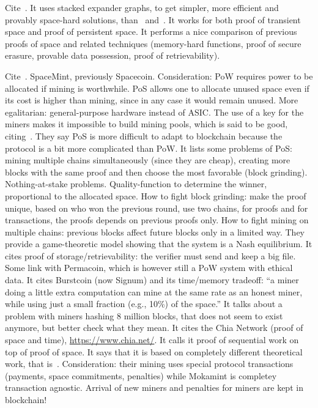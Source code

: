 Cite~\cite{RenD16}. It uses stacked expander graphs, to get simpler, more efficient and
provably space-hard solutions, than~\cite{AtenieseBFG14} and~\cite{DziembowskiFKP15}.
It works for both proof of transient space and proof of persistent space.
It performs a nice comparison of previous proofs of space
and related techniques (memory-hard functions, proof of secure erasure, provable data possession,
proof of retrievability).

Cite~\cite{ParkKFGAP18}. SpaceMint, previously Spacecoin. Consideration: PoW requires power
to be allocated if mining is worthwhile. PoS allows one to allocate unused space even if its
cost is higher than mining, since in any case it would remain unused. More egalitarian:
general-purpose hardware instead of ASIC. The use of a key for the miners makes it
impossible to build mining pools, which is said to be good, citing~\cite{MillerKKS15}.
They say PoS is more difficult to adapt to blockchain because the protocol is a bit
more complicated than PoW. It lists some problems of PoS: mining multiple chains simultaneously
(since they are cheap), creating more blocks with the same proof and then choose the most
favorable (block grinding). Nothing-at-stake problems. Quality-function to determine the winner, proportional
to the allocated space. How to fight block grinding: make the proof unique, based
on who won the previous round, use
two chains, for proofs and for transactions, the proofs depends on previous proofs only.
How to fight mining on multiple chains: previous blocks affect future blocks only in a limited way.
They provide a game-theoretic model showing that the system is a Nash equilibrium.
It cites proof of storage/retrievability: the verifier must send and keep a big file.
Some link with Permacoin, which is however still a PoW system with ethical data.
It cites Burstcoin (now Signum) and its time/memory tradeoff:
``a miner doing a little extra computation can mine at the same
rate as an honest miner, while using just a small fraction (e.g., 10\%) of the space.''
It talks about a problem with miners hashing 8 million blocks, that does not seem to exist
anymore, but better check what they mean.
It cites the Chia Network (proof of space and time), \url{https://www.chia.net/}.
It calls it proof of sequential work on top of proof of space.
It says that it is based on completely different theoretical work, that is~\cite{AbusalahACKPR17}.
Consideration: their mining uses special protocol transactions
(payments, space commitments, penalties) while Mokamint is completey transaction agnostic.
Arrival of new miners and penalties for miners are kept in blockchain!
